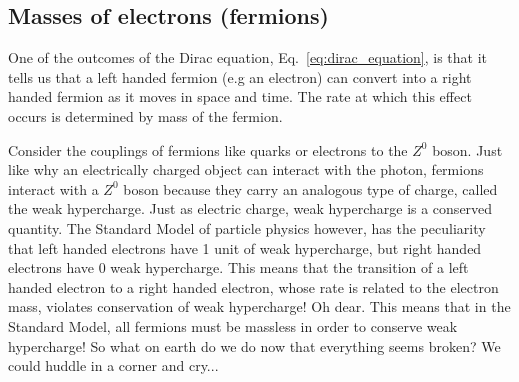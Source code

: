 \subsection{Masses of electrons (fermions)}
One of the outcomes of the Dirac equation, Eq.~\ref{eq:dirac_equation}, is that it tells us that a left handed fermion (e.g an electron) can convert into a right handed fermion as it moves in space and time. The rate at which this effect occurs is determined by mass of the fermion. 

Consider the couplings of fermions like quarks or electrons to the $Z^0$ boson. Just like why an electrically charged object can interact with the photon,  fermions interact with a $Z^0$ boson because they carry an analogous type of charge, called the weak hypercharge. Just as electric charge, weak hypercharge is a conserved quantity.
The Standard Model of particle physics however, has the peculiarity that left handed electrons have 1 unit of weak hypercharge, but right handed electrons have 0 weak hypercharge. This means that the transition of a left handed electron to a right handed electron, whose rate is related to the electron mass, violates conservation of weak hypercharge! Oh dear. This means that in the Standard Model, all fermions must be massless in order to conserve weak hypercharge! So what on earth do we do now that everything seems broken? We could huddle in a corner and cry...


